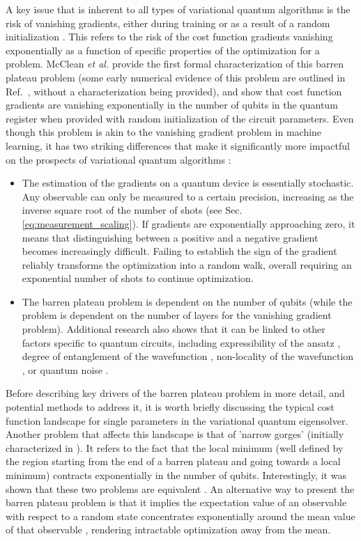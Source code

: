 A key issue that is inherent to all types of variational quantum algorithms is the risk of vanishing gradients, either during training or as a result of a random initialization \cite{McClean2018}. This refers to the risk of the cost function gradients vanishing exponentially as a function of specific properties of the optimization for a problem. McClean \textit {et al.} \cite{McClean2018} provide the first formal characterization of this barren plateau problem (some early numerical evidence of this problem are outlined in Ref.~\cite{Wecker2015}, without a characterization being provided), and show that cost function gradients are vanishing exponentially in the number of qubits in the quantum register when provided with random initialization of the circuit parameters. Even though this problem is akin to the vanishing gradient problem in machine learning, it has two striking differences that make it significantly more impactful on the prospects of variational quantum algorithms \cite{McClean2018}:
\begin{itemize}
    \item The estimation of the gradients on a quantum device is essentially stochastic. Any observable can only be measured to a certain precision, increasing as the inverse square root of the number of shots (see Sec. \ref{eq:measurement_scaling}). If gradients are exponentially approaching zero, it means that distinguishing between a positive and a negative gradient becomes increasingly difficult. Failing to establish the sign of the gradient reliably transforms the optimization into a random walk, overall requiring an exponential number of shots to continue optimization.
    \item The barren plateau problem is dependent on the number of qubits (while the problem is dependent on the number of layers for the vanishing gradient problem). Additional research also shows that it can be linked to other factors specific to quantum circuits, including expressibility of the ansatz \cite{Holmes2021}, degree of entanglement of the wavefunction \cite{OrtizMarrero2020, Patti2021}, non-locality of the wavefunction \cite{Cerezo2021_BP, Uvarov2020, Sharma2020}, or quantum noise \cite{Wang2020}.
\end{itemize}

Before describing key drivers of the barren plateau problem in more detail, and potential methods to address it, it is worth briefly discussing the typical cost function landscape for single parameters in the variational quantum eigensolver. Another problem that affects this landscape is that of 'narrow gorges' (initially characterized in \cite{Cerezo2021_BP}). It refers to the fact that the local minimum (well defined by the region starting from the end of a barren plateau and going towards a local minimum) contracts exponentially in the number of qubits. Interestingly, it was shown that these two problems are equivalent \cite{Arrasmith2021}. An alternative way to present the barren plateau problem is that it implies the expectation value of an observable with respect to a random state concentrates exponentially around the mean value of that observable \cite{McClean2018}, rendering intractable optimization away from the mean. 

